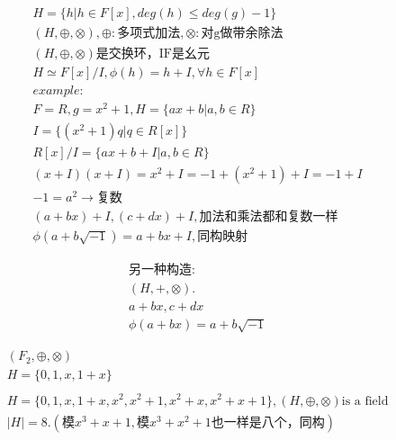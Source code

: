 \documentclass[12pt, a4paper]{article}  %
\begin{document}
\begin{align}
    &H=\{h|h\in F[x],deg(h)\leqslant deg(g)-1\}\\
    &(H,\oplus,\otimes),\oplus:\text{多项式加法},\otimes:\text{对g做带余除法}\\
    &(H,\oplus,\otimes)\text{是交换环，IF是幺元}\\
    &H\simeq F[x]/I,\phi(h)=h+I,\forall h\in F[x]\\
    &example:\\
    &F=R,g=x^2+1,H=\{ax+b|a,b\in R\}\\
    &I=\{(x^2+1)q|q\in R[x]\}\\
    &R[x]/I=\{ax+b+I|a,b\in R\}\\
    &(x+I)(x+I)=x^2+I=-1+(x^2+1)+I=-1+I\\
    &-1=a^2\rightarrow\text{复数}\\
    &(a+bx)+I,(c+dx)+I,\text{加法和乘法都和复数一样}\\
    &\phi(a+b\sqrt{-1})=a+bx+I,\text{同构映射}
\end{align}

\begin{align}
    &\text{另一种构造:}\\
    &(H,+,\otimes).\\
    &a+bx,c+dx\\
    &\phi(a+bx)=a+b\sqrt{-1}
\end{align}

\begin{align}
    &(F_2,\oplus,\otimes)\\
    &H=\{0,1,x,1+x\}\\
    &\\
    &H=\{0,1,x,1+x,x^2,x^2+1,x^2+x,x^2+x+1\},(H,\oplus,\otimes)\text{is a field}\\
    &|H|=8.(\text{模}x^3+x+1,\text{模}x^3+x^2+1\text{也一样是八个，同构})
\end{align}
\end{document}
